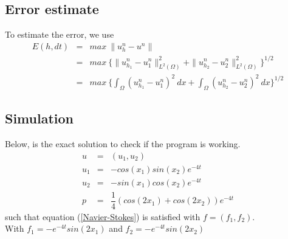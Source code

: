 \documentclass[a4paper,10pt]{article}
\begin{document}
\subsection{Error estimate}
To estimate the error, we use
\begin{eqnarray}\nonumber
E(h,dt) &=& max \ \| u_{h}^{n}-u^{n} \| \\ \nonumber
&=& max \ \{ \| u_{h_{1}}^{n}-u_{1}^{n} \|_{L^2(\Omega)}^{2} + \| u_{h_{2}}^{n}-u_{2}^{n} \|_{L^2(\Omega)}^{2} \}^{1/2} \\ \nonumber
&=& max \ \{ \int_{\Omega} (u_{h_{1}}^{n}-u_{1}^{n})^2 \ dx + \int_{\Omega} (u_{h_{2}}^{n}-u_{2}^{n})^2 \ dx \}^{1/2}
\end{eqnarray}


\subsection{Simulation}
Below, is the exact solution to check if the program is working.
\begin{eqnarray} \nonumber
u &=& (u_{1},u_{2})\\ \nonumber
u_{1} &=& -cos(x_{1}) sin(x_{2}) e^{-4t} \\\nonumber
u_{2} &=& -sin(x_{1}) cos(x_{2}) e^{-4t} \\\nonumber
p &=& \dfrac{1}{4} (cos(2x_{1}) + cos(2x_{2})) e^{-4t}
\end{eqnarray}
such that equation (\ref{Navier-Stokes}) is satisfied with $ f = (f_{1},f_{2}) $. \\With $ f_{1} = -e^{-4t}sin(2x_{1}) $ and $ f_{2} = -e^{-4t} sin(2x_{2}) $
\end{document}
